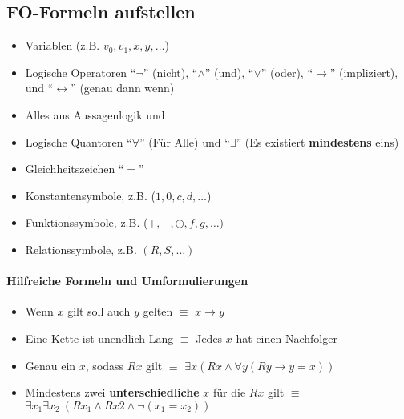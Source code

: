 \documentclass[
    ngerman,
    color=3b,
    summary,
    boxarc,
    main,
    fleqn,
    leqno,
]{rubos-tuda-template}
\begin{document}
    \subsection{FO-Formeln aufstellen}
    \begin{definition}[Aussagenlogik]\mbox{}
        \begin{itemize}
            \item Variablen (z.B. $v_0, v_1, x, y,\dots $)
            \item Logische Operatoren \enquote{$\lnot$} (nicht), \enquote{$\land$} (und), \enquote{$\lor$} (oder),
                \enquote{$\rightarrow{}$} (impliziert), und \enquote{$\leftrightarrow$} (genau dann wenn)
        \end{itemize}
    \end{definition}
    \begin{definition}[FO-Logik]\mbox{}
        \begin{itemize}
            \item Alles aus Aussagenlogik und
            \item Logische Quantoren \enquote{$\forall$} (Für Alle) und \enquote{$\exists$} (Es existiert \textbf{mindestens} eins)
            \item Gleichheitszeichen \enquote{$=$}
            \item Konstantensymbole, z.B. ($1,0,c,d,\dots$)
            \item Funktionssymbole, z.B. ($+,-,\odot,f,g,\dots)$
            \item Relationssymbole, z.B. $(R,S,\dots)$
        \end{itemize}
    \end{definition}
    \paragraph{Hilfreiche Formeln und Umformulierungen}\mbox{}
    \begin{itemize}
        \item Wenn $x$ gilt soll auch $y$ gelten $\equiv$ $x\rightarrow{}y$
        \item Eine Kette ist unendlich Lang $\equiv$ Jedes $x$ hat einen Nachfolger
        \item Genau ein $x$, sodass $Rx$ gilt $\equiv$ $\exists x (Rx \land \forall y (Ry\rightarrow{}y=x))$
        \item Mindestens zwei \textbf{unterschiedliche} $x$ für die $Rx$ gilt $\equiv$ $\exists x_1\exists x_2~(Rx_1\land Rx2\land \lnot(x_1=x_2))$
    \end{itemize}
    \clearpage
\end{document}
